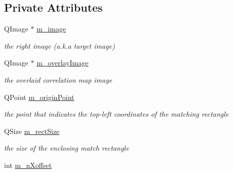 \subsection*{Private Attributes}
\begin{CompactItemize}
\item 
\hypertarget{classTargetImgLabel_e532d541556a3647cff5a83bcf1306c3}{
QImage $\ast$ \hyperlink{classTargetImgLabel_e532d541556a3647cff5a83bcf1306c3}{m\_\-image}}
\label{classTargetImgLabel_e532d541556a3647cff5a83bcf1306c3}

\begin{CompactList}\small\item\em the right image (a.k.a target image) \item\end{CompactList}\item 
\hypertarget{classTargetImgLabel_94cf2b5841057d54bf3172aa2fef1e83}{
QImage $\ast$ \hyperlink{classTargetImgLabel_94cf2b5841057d54bf3172aa2fef1e83}{m\_\-overlayImage}}
\label{classTargetImgLabel_94cf2b5841057d54bf3172aa2fef1e83}

\begin{CompactList}\small\item\em the overlaid correlation map image \item\end{CompactList}\item 
\hypertarget{classTargetImgLabel_0ed69ba29f03494cdd3ec22d9df4e15f}{
QPoint \hyperlink{classTargetImgLabel_0ed69ba29f03494cdd3ec22d9df4e15f}{m\_\-originPoint}}
\label{classTargetImgLabel_0ed69ba29f03494cdd3ec22d9df4e15f}

\begin{CompactList}\small\item\em the point that indicates the top-left coordinates of the matching rectangle \item\end{CompactList}\item 
\hypertarget{classTargetImgLabel_e9e4109bdd7a8a6b5d0bd59850c6abba}{
QSize \hyperlink{classTargetImgLabel_e9e4109bdd7a8a6b5d0bd59850c6abba}{m\_\-rectSize}}
\label{classTargetImgLabel_e9e4109bdd7a8a6b5d0bd59850c6abba}

\begin{CompactList}\small\item\em the size of the enclosing match rectangle \item\end{CompactList}\item 
\hypertarget{classTargetImgLabel_303d7686a3dd92560851dabe82425d89}{
int \hyperlink{classTargetImgLabel_303d7686a3dd92560851dabe82425d89}{m\_\-nXoffset}}
\label{classTargetImgLabel_303d7686a3dd92560851dabe82425d89}


\end{CompactItemize}
